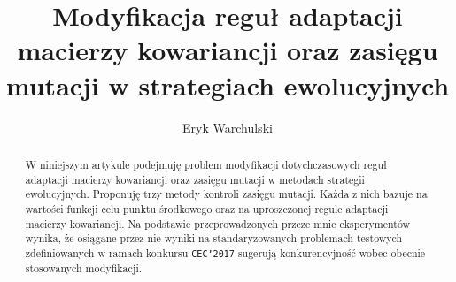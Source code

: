 
\title{Modyfikacja reguł adaptacji macierzy kowariancji oraz zasięgu mutacji w strategiach ewolucyjnych}
\author{Eryk Warchulski}

\maketitle
\begin{abstract}
  W niniejszym artykule podejmuję problem modyfikacji dotychczasowych reguł adaptacji macierzy kowariancji oraz zasięgu mutacji w metodach strategii ewolucyjnych.
  Proponuję trzy metody kontroli zasięgu mutacji. Każda z nich bazuje na wartości funkcji celu punktu środkowego oraz na uproszczonej regule adaptacji macierzy kowariancji.
  Na podstawie przeprowadzonych przeze mnie eksperymentów wynika, że osiągane przez nie wyniki na standaryzowanych problemach testowych zdefiniowanych w ramach konkursu \texttt{CEC'2017} sugerują konkurencyjność wobec obecnie stosowanych modyfikacji. 
\end{abstract}










